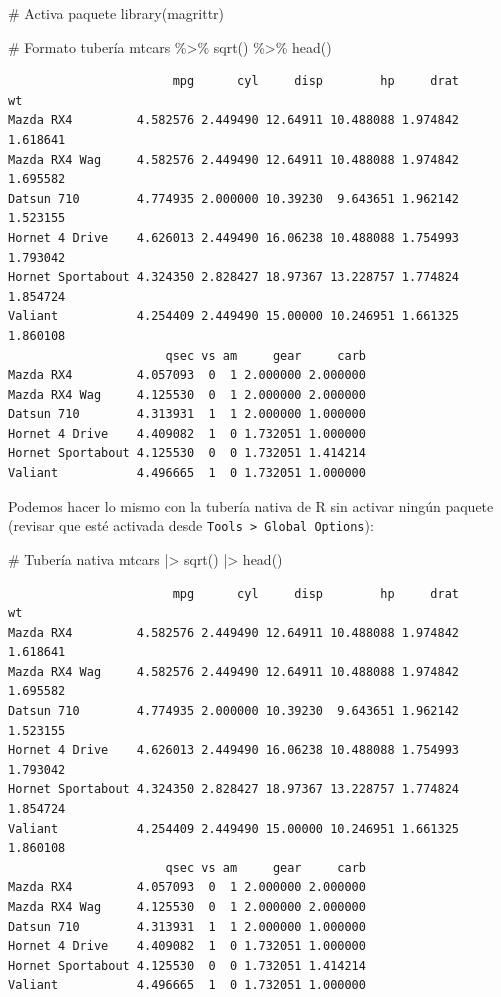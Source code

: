 \documentclass[
  spanish,
  letterpaper,
  DIV=11,
  numbers=noendperiod]{scrreprt}
\newenvironment{Shaded}{\begin{snugshade}}{\end{snugshade}}
\newcommand{\CommentTok}[1]{\textcolor[rgb]{0.37,0.37,0.37}{#1}}
\newcommand{\FunctionTok}[1]{\textcolor[rgb]{0.28,0.35,0.67}{#1}}
\newcommand{\NormalTok}[1]{\textcolor[rgb]{0.00,0.23,0.31}{#1}}
\newcommand{\SpecialCharTok}[1]{\textcolor[rgb]{0.37,0.37,0.37}{#1}}
\begin{document}
\begin{Shaded}
\begin{Highlighting}[]
\CommentTok{\# Activa paquete}
\FunctionTok{library}\NormalTok{(magrittr)}

\CommentTok{\# Formato tubería}
\NormalTok{mtcars }\SpecialCharTok{\%\textgreater{}\%}
  \FunctionTok{sqrt}\NormalTok{() }\SpecialCharTok{\%\textgreater{}\%}
  \FunctionTok{head}\NormalTok{()}
\end{Highlighting}
\end{Shaded}

\begin{verbatim}
                       mpg      cyl     disp        hp     drat       wt
Mazda RX4         4.582576 2.449490 12.64911 10.488088 1.974842 1.618641
Mazda RX4 Wag     4.582576 2.449490 12.64911 10.488088 1.974842 1.695582
Datsun 710        4.774935 2.000000 10.39230  9.643651 1.962142 1.523155
Hornet 4 Drive    4.626013 2.449490 16.06238 10.488088 1.754993 1.793042
Hornet Sportabout 4.324350 2.828427 18.97367 13.228757 1.774824 1.854724
Valiant           4.254409 2.449490 15.00000 10.246951 1.661325 1.860108
                      qsec vs am     gear     carb
Mazda RX4         4.057093  0  1 2.000000 2.000000
Mazda RX4 Wag     4.125530  0  1 2.000000 2.000000
Datsun 710        4.313931  1  1 2.000000 1.000000
Hornet 4 Drive    4.409082  1  0 1.732051 1.000000
Hornet Sportabout 4.125530  0  0 1.732051 1.414214
Valiant           4.496665  1  0 1.732051 1.000000
\end{verbatim}

Podemos hacer lo mismo con la tubería nativa de R sin activar ningún
paquete (revisar que esté activada desde
\texttt{Tools\ \textgreater{}\ Global\ Options}):

\begin{Shaded}
\begin{Highlighting}[]
\CommentTok{\# Tubería nativa}
\NormalTok{mtcars }\SpecialCharTok{|\textgreater{}}
  \FunctionTok{sqrt}\NormalTok{() }\SpecialCharTok{|\textgreater{}}
  \FunctionTok{head}\NormalTok{()}
\end{Highlighting}
\end{Shaded}

\begin{verbatim}
                       mpg      cyl     disp        hp     drat       wt
Mazda RX4         4.582576 2.449490 12.64911 10.488088 1.974842 1.618641
Mazda RX4 Wag     4.582576 2.449490 12.64911 10.488088 1.974842 1.695582
Datsun 710        4.774935 2.000000 10.39230  9.643651 1.962142 1.523155
Hornet 4 Drive    4.626013 2.449490 16.06238 10.488088 1.754993 1.793042
Hornet Sportabout 4.324350 2.828427 18.97367 13.228757 1.774824 1.854724
Valiant           4.254409 2.449490 15.00000 10.246951 1.661325 1.860108
                      qsec vs am     gear     carb
Mazda RX4         4.057093  0  1 2.000000 2.000000
Mazda RX4 Wag     4.125530  0  1 2.000000 2.000000
Datsun 710        4.313931  1  1 2.000000 1.000000
Hornet 4 Drive    4.409082  1  0 1.732051 1.000000
Hornet Sportabout 4.125530  0  0 1.732051 1.414214
Valiant           4.496665  1  0 1.732051 1.000000
\end{verbatim}
\end{document}
